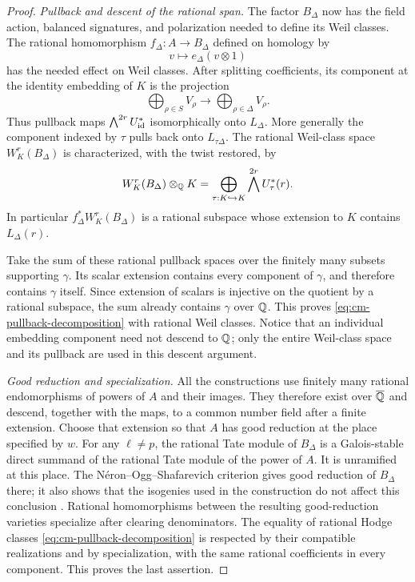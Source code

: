 \begin{proof}
\medskip\noindent
\emph{Pullback and descent of the rational span.}
The factor $B_\Delta$ now has the field action, balanced signatures,
and polarization needed to define its Weil classes.  The rational
homomorphism $f_\Delta\colon A\to B_\Delta$ defined on
homology by
\[
                      v\longmapsto e_\Delta(v\otimes 1)
\]
has the needed effect on Weil classes.  After splitting coefficients,
its component at the identity embedding of $K$ is the projection
\[
                 \bigoplus_{\rho\in S}V_\rho
                    \longrightarrow
                 \bigoplus_{\rho\in\Delta}V_\rho.
\]
Thus pullback maps $\bigwedge^{2r}U_{\operatorname{id}}^*$ isomorphically onto
$L_\Delta$.  More generally the component indexed by $\tau$ pulls back
onto $L_{\tau\Delta}$.  The rational Weil-class space $W_K^r(B_\Delta)$
is characterized, with the twist restored, by
\[
 W_K^r(B_\Delta)\otimes_{\mathbb Q}K
       =\bigoplus_{\tau:K\hookrightarrow K}
                         \bigwedge^{2r}U_\tau^*(r).
\]
In particular $f_\Delta^*W_K^r(B_\Delta)$ is a rational subspace whose
extension to $K$ contains $L_\Delta(r)$.

Take the sum of these rational pullback spaces over the finitely many
subsets supporting $\gamma$.  Its scalar extension contains every
component of $\gamma$, and therefore contains $\gamma$ itself.  Since
extension of scalars is injective on the quotient by a rational
subspace, the sum already contains $\gamma$ over $\mathbb Q$.  This proves
\eqref{eq:cm-pullback-decomposition} with rational Weil classes.  Notice
that an individual embedding component need not descend to $\mathbb Q$;
only the entire Weil-class space and its pullback are used in this
descent argument.

\medskip\noindent
\emph{Good reduction and specialization.}
All the constructions use finitely many rational endomorphisms of
powers of $A$ and their images.  They therefore exist over $\overline{\mathbb Q}$ and
descend, together with the maps, to a common number field after a finite
extension.  Choose that extension so that $A$ has good reduction at the
place specified by $w$.  For any $\ell\ne p$, the rational Tate module
of $B_\Delta$ is a Galois-stable direct summand of the rational Tate
module of the power of $A$.  It is unramified at this place.  The
N\'eron--Ogg--Shafarevich criterion gives good reduction of
$B_\Delta$ there; it also shows that the isogenies used in the
construction do not affect this conclusion
\cite[Chapter~IV, Theorem~3.5]{MilneAVNotes}.  Rational homomorphisms between
the resulting good-reduction varieties specialize after clearing
denominators.  The equality of rational Hodge classes
\eqref{eq:cm-pullback-decomposition} is respected by their compatible
realizations and by specialization, with the same rational coefficients
in every component.  This proves the last assertion.
\end{proof}

